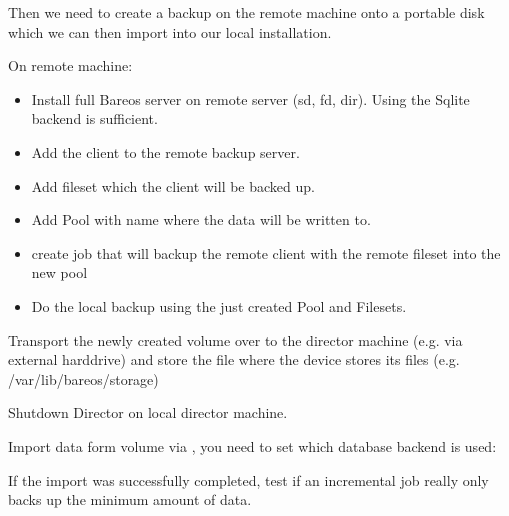 Then we need to create a backup on the remote machine onto a portable disk which we can then import into our local installation.

On remote machine:

\begin{itemize}
    \item Install full Bareos server on remote server (sd, fd, dir). Using the Sqlite backend is sufficient.
    \item Add the client to the remote backup server.
    \item Add fileset which the client will be backed up.
    \item Add Pool with name  where the data will be written to.
    \item create job that will backup the remote client with the remote fileset into the new pool
    \item Do the local backup using the just created Pool and Filesets.
\end{itemize}

Transport the newly created volume over to the director machine (e.g. via external harddrive)
and store the file where the device stores its files (e.g. /var/lib/bareos/storage)

Shutdown Director on local director machine.

Import data form volume via , you need to set which database backend is used:

If the import was successfully completed, test if an incremental job really only backs up
the minimum amount of data.

